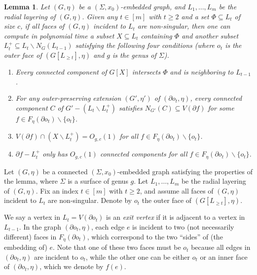\documentclass[a4paper,11pt]{article}
\newtheorem{lemma}{Lemma}
\numberwithin{lemma}{section}
\begin{document}
\begin{lemma} \label{lem-key}
 Let $(G,\eta)$ be a $(\varSigma,x_0)$-embedded graph, and $L_1,\dots,L_m$ be the radial layering of $(G,\eta)$.
 Given any $t \in [m]$ with $t \geq 2$ and a set $\varPhi \subseteq L_t$ of size $c$, if all faces of $(G,\eta)$ incident to $L_t$ are non-singular, then one can compute in polynomial time a subset $X \subseteq L_t$ containing $\varPhi$ and another subset $L_t^+ \subseteq L_t \backslash N_G(L_{t-1})$ satisfying the following four conditions (where $o_t$ is the outer face of $(G[L_{\geq t}],\eta)$ and $g$ is the genus of $\varSigma$).
 \begin{enumerate}[label = (\arabic*)]
  \item\label{item:rcd-key-1} Every connected component of $G[X]$ intersects $\varPhi$ and is neighboring to $L_{t-1}$.
  \item\label{item:rcd-key-2} For any outer-preserving extension $(G',\eta')$ of $(\partial o_t,\eta)$, every connected component $C$ of $G'-(L_t \backslash L_t^+)$ satisfies $N_{G'}(C) \subseteq V(\partial f)$ for some $f \in F_\eta(\partial o_t) \backslash \{o_t\}$.
  \item\label{item:rcd-key-3} $V(\partial f) \cap (X \backslash L_t^+) = O_{g,c}(1)$ for all $f \in F_\eta(\partial o_t) \backslash \{o_t\}$.
  \item\label{item:rcd-key-4} $\partial f - L_t^+$ only has $O_{g,c}(1)$ connected components for all $f \in F_\eta(\partial o_t) \backslash \{o_t\}$.
 \end{enumerate}
\end{lemma}

Let $(G,\eta)$ be a connected $(\varSigma,x_0)$-embedded graph satisfying the properties of the lemma, where $\varSigma$ is a surface of genus $g$.
Let $L_1,\dots,L_m$ be the radial layering of $(G,\eta)$.
Fix an index $t \in [m]$ with $t \geq 2$, and assume all faces of $(G,\eta)$ incident to $L_t$ are non-singular.
Denote by $o_t$ the outer face of $(G[L_{\geq t}],\eta)$.

We say a vertex in $L_t = V(\partial o_t)$ is an \textit{exit vertex} if it is adjacent to a vertex in $L_{t-1}$.
In the graph $(\partial o_t,\eta)$, each edge $e$ is incident to two (not necessarily different) faces in $F_\eta(\partial o_t)$, which correspond to the two ``sides'' of (the embedding of) $e$.
Note that one of these two faces must be $o_t$ because all edges in $(\partial o_t,\eta)$ are incident to $o_t$, while the other one can be either $o_t$ or an inner face of $(\partial o_t,\eta)$, which we denote by $f(e)$.
\end{document}

